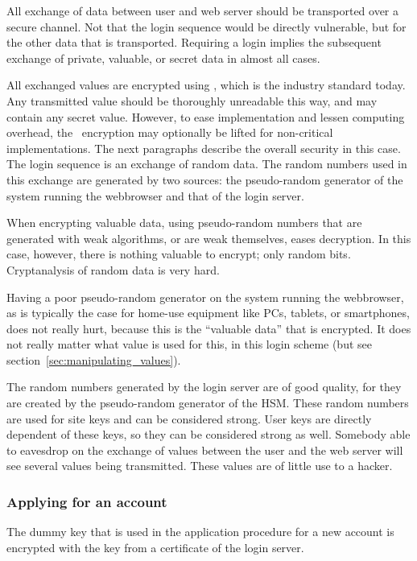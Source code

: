 All exchange of data between user and web server should be transported over a secure channel.
Not that the login sequence would be directly vulnerable,
but for the other data that is transported.
Requiring a login implies the subsequent exchange of private, valuable, or secret data in almost all cases.
\par
All exchanged values are encrypted using \AES, which is the industry standard today.
Any transmitted value should be thoroughly unreadable this way,
and may contain any secret value.
However, to ease implementation and lessen computing overhead, the \AES\ encryption may optionally be lifted
for non-critical implementations.
The next paragraphs describe the overall security in this case.
The login sequence is an exchange of random data.
The random numbers used in this exchange are generated by two sources:
the pseudo-random generator of the system running the webbrowser and that of the login server.
\par
When encrypting valuable data,
using pseudo-random numbers that are generated with weak algorithms,
or are weak themselves,
eases decryption.
In this case,
however,
there is nothing valuable to encrypt;
only random bits.
Cryptanalysis of random data is very hard.
\par
Having a poor pseudo-random generator on the system running the webbrowser,
as is typically the case for home-use equipment like PCs,
tablets,
or smartphones,
does not really hurt,
because this is the ``valuable data'' that is encrypted.
It does not really matter what value is used for this,
in this login scheme
(but see section~\ref{sec:manipulating_values}).
\par
The random numbers generated by the login server are of good quality,
for they are created by the pseudo-random generator of the HSM.
These random numbers are used for site keys and can be considered strong.
User keys are directly dependent of these keys,
so they can be considered strong as well.
Somebody able to eavesdrop on the exchange of values between the user
and the web server will see several values being transmitted.
These values are of little use to a hacker.
\subsubsection{Applying for an account}
The dummy key that is used in the application procedure for a new account is encrypted with the key
from a certificate of the login server.

